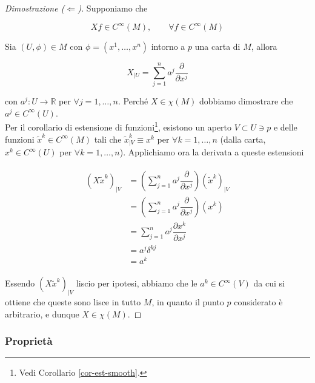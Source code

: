 \begin{proof}[Dimostrazione ($ \Longleftarrow $)]
	Supponiamo che
	
	\begin{equation}
		X f \in C^{\infty}(M), \qquad \forall f \in C^{\infty}(M)
	\end{equation}

	Sia $ (U,\phi) \in M $ con $ \phi = (x^{1},\dots,x^{n}) $ intorno a $ p $ una carta di $ M $, allora
	
	\begin{equation}
		X_{|U} = \sum_{j=1}^{n} a^{j} \dfrac{\partial}{\partial x^{j}}
	\end{equation}

	con $ a^{j} : U \to \mathbb{R} $ per $ \forall j=1,\dots,n $. Perché $ X \in \chi(M) $ dobbiamo dimostrare che $ a^{j} \in C^{\infty}(U) $.\\
	Per il corollario di estensione di funzioni\footnote{%
		Vedi Corollario \ref{cor-est-smooth}.%
	}, esistono un aperto $ V \subset U \ni p $ e delle funzioni $ \tilde{x}^{k} \in C^{\infty}(M) $ tali che $ \tilde{x}^{k}_{|V} \equiv x^{k} $ per $ \forall k=1,\dots,n $ (dalla carta, $ x^{k} \in C^{\infty}(U) $ per $ \forall k=1,\dots,n $). Applichiamo ora la derivata a queste estensioni
	
	\begin{align}
		\begin{split}
			(X \tilde{x}^{k})_{|V} &= \left( \sum_{j=1}^{n} a^{j} \dfrac{\partial}{\partial x^{j}} \right) (\tilde{x}^{k})_{|V}\\
			&= \left( \sum_{j=1}^{n} a^{j} \dfrac{\partial}{\partial x^{j}} \right) (x^{k})\\
			&= \sum_{j=1}^{n} a^{j} \dfrac{\partial x^{k}}{\partial x^{j}}\\
			&= a^{j} \delta^{kj}\\
			&= a^{k}
		\end{split}
	\end{align}

	Essendo $ (X \tilde{x}^{k})_{|V} $ liscio per ipotesi, abbiamo che le $ a^{k} \in C^{\infty}(V) $ da cui si ottiene che queste sono lisce in tutto $ M $, in quanto il punto $ p $ considerato è arbitrario, e dunque $ X \in \chi(M) $.
\end{proof}

\subsubsection{Proprietà}

